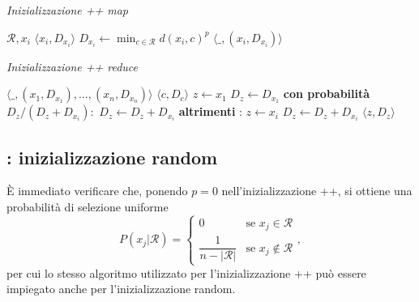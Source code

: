 \documentclass[runningheads]{llncs}
\begin{document}
\begin{minipage}[t]{0.48\textwidth}
\begin{algorithm}[H]
    \caption{\textit{Inizializzazione ++ map}}
\begin{algorithmic}[1]
    \Require $\mathcal{R}, x_i$
    \Ensure $\langle x_i, D_{x_i}  \rangle $
    \State $D_{x_i} \leftarrow \min_{c \in \mathcal{R}} d(x_i, c)^p$
    \State\Return $\langle \text{\_}, (x_i, D_{x_i})\rangle $
\end{algorithmic}
\end{algorithm}
\end{minipage}
\vspace{\fill}
\begin{minipage}[t]{0.48\textwidth}
\begin{algorithm}[H]
    \caption{\textit{Inizializzazione ++ reduce}}
\begin{algorithmic}[1]
    \Require $\langle  \text{\_}, (x_1, D_{x_1}), \ldots,  (x_n, D_{x_n})\rangle$
    \Ensure $\langle c, D_c \rangle $
    \State $z \leftarrow x_1$
    \State $D_z \leftarrow D_{x_1}$
    \State \textbf{con probabilità }$D_z / (D_z + D_{x_i}):$ 
    \State \hspace*{0.5cm} $D_z \leftarrow D_z + D_{x_i}$
    \State \textbf{altrimenti} :
    \State \hspace*{0.5cm} $z \leftarrow x_i$
    \State \hspace*{0.5cm} $D_z \leftarrow D_z + D_{x_i}$
    \EndFor
    \State\Return $\langle z, D_z \rangle $
\end{algorithmic}
\end{algorithm}
\end{minipage}

\subsection*{\mr: inizializzazione random}
È immediato verificare che, ponendo $p=0$ nell'inizializzazione ++, si ottiene una probabilità di selezione uniforme
\[
    P(x_j | \mathcal{R}) = \begin{cases}
        0 & \text{se } x_j \in \mathcal{R}\\[.15cm]
        \dfrac{1}{n - |\mathcal{R}|} &\text{se } x_j \not\in \mathcal{R}
    \end{cases},
\]
per cui lo stesso algoritmo utilizzato per l'inizializzazione ++ può essere impiegato anche per l'inizializzazione random.
\end{document}
